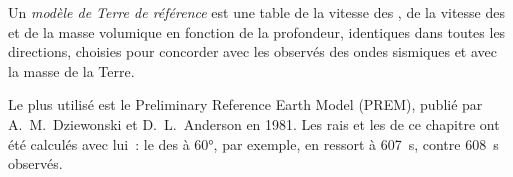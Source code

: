 \begin{definition}\label{def:g11:seismic-structure:reference-model}
Un \emph{modèle de Terre de référence}
est une table de la vitesse des
, de la vitesse des  et de la masse volumique en fonction de
la profondeur, identiques dans toutes les directions, choisies pour
concorder avec les  observés des ondes sismiques et avec la
masse de la Terre.
\end{definition}

Le plus utilisé est le Preliminary Reference Earth Model (PREM), publié par
A.~M.~Dziewonski et D.~L.~Anderson en 1981. Les rais et les 
de ce chapitre ont été calculés avec lui~: le  des  à
\ang{60}, par exemple, en ressort à \qty{607}{s}, contre \qty{608}{s}
observés.

